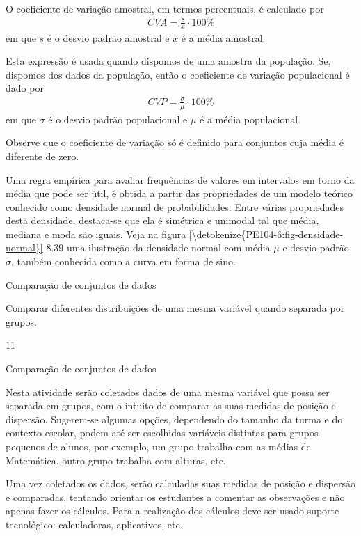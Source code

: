 {{O coeficiente de variação amostral, em termos percentuais, é calculado  por
\begin{equation*}
\begin{split}CVA=\frac{s}{\bar{x}}\cdot 100 \%\end{split}
\end{equation*}
em que \(s\) é o desvio padrão amostral e \(\bar{x}\) é a média amostral.

Esta expressão é usada quando dispomos de uma amostra da população. Se, dispomos dos dados da população, então o coeficiente de variação populacional é dado por
\begin{equation*}
\begin{split}CVP=\frac{{\sigma}}{\mu}\cdot 100\%\end{split}
\end{equation*}
em que \(\sigma\) é o desvio padrão populacional e \(\mu\) é a média populacional.

Observe que o coeficiente de variação só é definido para conjuntos cuja média é diferente de zero.

Uma regra empírica para avaliar frequências de valores em intervalos em torno da média que pode ser útil, é obtida a partir das propriedades de um modelo teórico conhecido como densidade normal de probabilidades. Entre várias propriedades desta densidade, destaca-se que ela é simétrica e unimodal tal que média, mediana e moda são iguais. Veja na \hyperref[\detokenize{PE104-6:fig-densidade-normal}]{figura \ref{\detokenize{PE104-6:fig-densidade-normal}}} 8.39 uma ilustração da densidade normal com média \(\mu\) e desvio padrão \(\sigma\), também conhecida como a curva em forma de sino.
\clearpage
{\def\currentcolor{session2}
\begin{objectives}{Comparação de conjuntos de dados}
{
Comparar diferentes distribuições de uma mesma variável quando separada por grupos.


}{1}{1}
\end{objectives}
\begin{sugestions}{Comparação de conjuntos de dados}
{
Nesta atividade serão coletados dados de uma mesma variável que possa ser separada em grupos, com o intuito de comparar as suas medidas de posição e dispersão. Sugerem-se algumas opções, dependendo do tamanho da turma e do contexto escolar, podem até ser escolhidas variáveis distintas para grupos pequenos de alunos, por exemplo, um grupo trabalha com as médias de Matemática, outro grupo trabalha com alturas, etc.

Uma vez coletados os dados, serão calculadas suas medidas de posição e dispersão e comparadas, tentando orientar os estudantes a comentar as observações e não apenas fazer os cálculos. Para a realização dos cálculos deve ser usado suporte tecnológico: calculadoras, aplicativos, etc.

}
\end{sugestions}}}}
